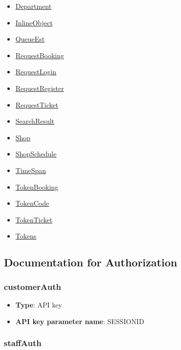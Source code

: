 \begin{itemize}
\tightlist
\item
  \href{./Models/Department.md}{Department}
\item
  \href{./Models/InlineObject.md}{InlineObject}
\item
  \href{./Models/QueueEst.md}{QueueEst}
\item
  \href{./Models/RequestBooking.md}{RequestBooking}
\item
  \href{./Models/RequestLogin.md}{RequestLogin}
\item
  \href{./Models/RequestRegister.md}{RequestRegister}
\item
  \href{./Models/RequestTicket.md}{RequestTicket}
\item
  \href{./Models/SearchResult.md}{SearchResult}
\item
  \href{./Models/Shop.md}{Shop}
\item
  \href{./Models/ShopSchedule.md}{ShopSchedule}
\item
  \href{./Models/TimeSpan.md}{TimeSpan}
\item
  \href{./Models/TokenBooking.md}{TokenBooking}
\item
  \href{./Models/TokenCode.md}{TokenCode}
\item
  \href{./Models/TokenTicket.md}{TokenTicket}
\item
  \href{./Models/Tokens.md}{Tokens}
\end{itemize}

\hypertarget{documentation-for-authorization}{%
\subsection{Documentation for
Authorization}\label{documentation-for-authorization}}

\hypertarget{customerauth}{%
\subsubsection{customerAuth}\label{customerauth}}

\begin{itemize}
\tightlist
\item
  \textbf{Type}: API key
\item
  \textbf{API key parameter name}: SESSIONID
\end{itemize}

\hypertarget{staffauth}{%
\subsubsection{staffAuth}\label{staffauth}}

